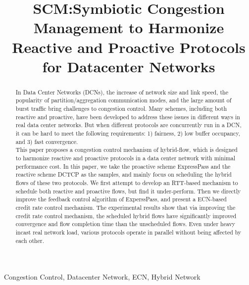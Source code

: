 \documentclass[conference]{IEEEtran}
\begin{document}
\title{SCM:Symbiotic Congestion Management to Harmonize Reactive and Proactive Protocols for Datacenter Networks\\
}

\author{

}

\maketitle

\begin{abstract}

In Data Center Networks (DCNs), the increase of network size and link speed, the popularity of partition/aggregation communication modes, and the large amount of burst traffic bring challenges to congestion control. Many schemes, including both reactive and proactive, have been developed to address these issues in different ways in real data center networks. But when different protocols are concurrently run in a DCN, it can be hard to meet the following requirements: 1) fairness, 2) low buffer occupancy, and 3) fast convergence.\\

This paper proposes a congestion control mechanism of hybrid-flow, which is designed to harmonize reactive and proactive protocols in a data center network with minimal performance cost. In this paper, we take the proactive scheme ExpressPass and the reactive scheme DCTCP as the samples, and mainly focus on scheduling the hybrid flows of these two protocols. We first attempt to develop an RTT-based mechanism to schedule both reactive and proactive flows, but find it under-perform. Then we directly improve the feedback control algorithm of ExperssPass, and present a ECN-based credit rate control mechanism. The experimental results show that via improving the credit rate control mechanism, the scheduled hybrid flows have significantly improved convergence and flow completion time than the unscheduled flows. Even under heavy incast real network load, various protocols operate in parallel without being affected by each other.

\end{abstract}

\begin{IEEEkeywords}
Congestion Control, Datacenter Network, ECN, Hybrid Network
\end{IEEEkeywords}
\end{document}
